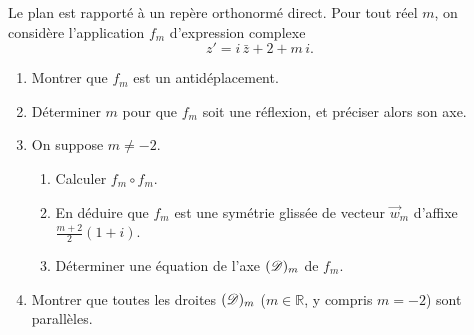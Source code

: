 \begin{exo}\label{exo:isom-famille-antideplacements}
      Le plan est rapporté à un repère orthonormé direct.
      Pour tout réel $m$, on considère l'application $f_m$ d'expression complexe
      \[
            z' = i\,\bar{z} + 2 + m\,i .
      \]
      \begin{enumerate}
            \item Montrer que $f_m$ est un antidéplacement.
            \item Déterminer $m$ pour que $f_m$ soit une réflexion, et préciser alors son axe.
            \item On suppose $m \neq -2$.
                  \begin{enumerate}
                        \item Calculer $f_m \circ f_m$.
                        \item En déduire que $f_m$ est une symétrie glissée de vecteur $\vec{w}_m$ d'affixe $\frac{m+2}{2}(1+i)$.
                        \item Déterminer une équation de l'axe $(\mathscr{D})_m$ de $f_m$.
                  \end{enumerate}
            \item Montrer que toutes les droites $(\mathscr{D})_m$ ($m \in \mathbb{R}$, y compris $m=-2$) sont parallèles.
      \end{enumerate}
\end{exo}
